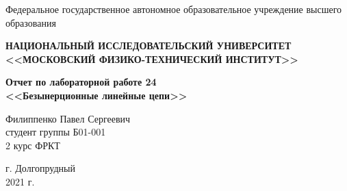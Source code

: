 \begin{center}
    
    \normalsize{Федеральное государственное автономное образовательное учреждение высшего образования}
    
    \textbf{НАЦИОНАЛЬНЫЙ ИССЛЕДОВАТЕЛЬСКИЙ УНИВЕРСИТЕТ \\ <<МОСКОВСКИЙ ФИЗИКО-ТЕХНИЧЕСКИЙ ИНСТИТУТ>>}
    \vspace{13ex}
    
    \textbf{Отчет по лабораторной работе 24\\ <<Безынерционные линейные цепи>>}
    \vspace{40ex}
    
    \normalsize{Филиппенко Павел Сергеевич \\ студент группы Б01-001\\ 2 курс ФРКТ\\}
\end{center}
    
\vfill 
    
\begin{center}
г. Долгопрудный\\ 
2021 г.
\end{center}


\thispagestyle{empty} %
\newpage